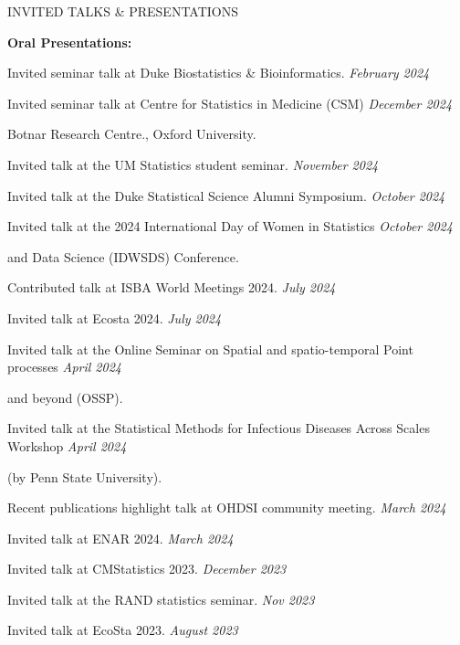\documentclass{resume} %
\begin{document}
\begin{rSection}{INVITED TALKS \& PRESENTATIONS}
	
	\hspace{-.2in} {\textbf{Oral Presentations:}}
	
	
	Invited seminar talk at Duke Biostatistics \& Bioinformatics.  \hfill {\em February 2024}
	
	Invited seminar talk at Centre for Statistics in Medicine (CSM)  \hfill {\em December 2024}
	
	\vspace{-0.1in} 
	Botnar Research Centre., Oxford University. 
	
	Invited talk at the UM Statistics student seminar.  \hfill {\em November 2024} 
	
	Invited talk at the Duke Statistical Science Alumni Symposium.  \hfill {\em October 2024} 
	
	Invited talk at the 2024 International Day of Women  in Statistics 
	 \hfill {\em October 2024} 
	 
	\vspace{-0.1in} 
	and Data Science (IDWSDS) Conference. 
	
	Contributed talk at ISBA World Meetings 2024.  \hfill {\em July 2024}
	
	Invited talk at Ecosta 2024.  \hfill {\em July 2024}
	
	Invited talk at the Online Seminar on Spatial and spatio-temporal Point processes   \hfill {\em April 2024}
	
	\vspace{-0.1in} 
	and beyond (OSSP).
	
	Invited talk at the Statistical Methods for Infectious Diseases Across Scales Workshop \hfill {\em April 2024}
	
	\vspace{-0.1in}
	(by Penn State University).
	
	Recent publications highlight talk at OHDSI community meeting. \hfill {\em March 2024}
	
	Invited talk at ENAR 2024.  \hfill {\em March 2024}
	
	Invited talk at CMStatistics 2023. \hfill {\em December 2023}
	
	Invited talk at the RAND statistics seminar. \hfill {\em Nov 2023}
	
	Invited talk at EcoSta 2023. \hfill {\em August 2023}
	

\end{rSection}
\end{document}
